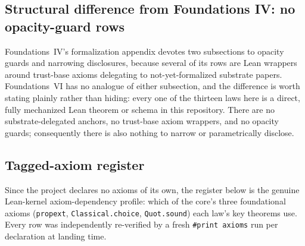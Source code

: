 \documentclass[11pt]{article}
\newcommand{\FVI}{Foundations~VI}
\newcommand{\FoundIV}{Foundations~IV}
\theoremstyle{definition}
\begin{document}
\subsection{Structural difference from Foundations IV: no opacity-guard rows}%
\label{subsec:opacity-guard-pattern}

\FoundIV's formalization appendix devotes two subsections to opacity guards and narrowing
disclosures, because several of its rows are Lean wrappers around trust-base axioms delegating to
not-yet-formalized substrate papers. \FVI{} has no analogue of either subsection, and the difference
is worth stating plainly rather than hiding: every one of the thirteen laws here is a direct, fully
mechanized Lean theorem or schema in this repository. There are no substrate-delegated anchors, no
trust-base axiom wrappers, and no opacity guards; consequently there is also nothing to narrow or
parametrically disclose.

\subsection{Tagged-axiom register}\label{subsec:tagged-axiom-register}

Since the project declares no axioms of its own, the register below is the genuine Lean-kernel
axiom-dependency profile: which of the core's three foundational axioms (\texttt{propext},
\texttt{Classical.choice}, \texttt{Quot.sound}) each law's key theorems use. Every row was
independently re-verified by a fresh \texttt{\#print axioms} run per declaration at landing time.
\end{document}
